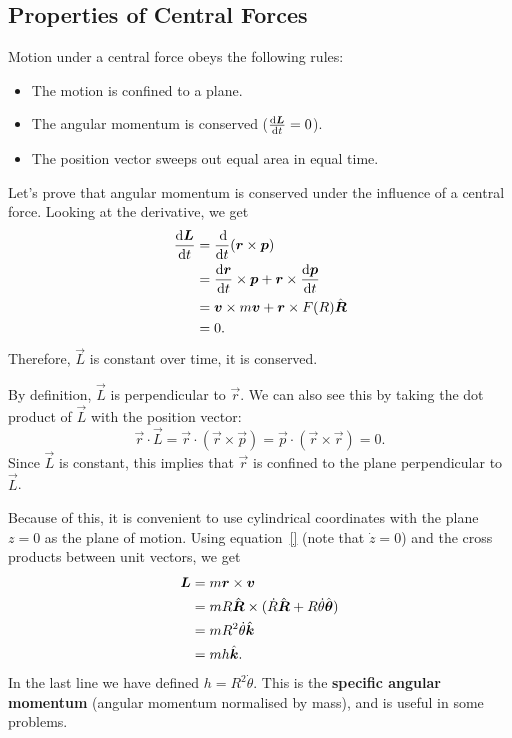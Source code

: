 \documentclass[../classical_mechanics.tex]{subfiles}
\begin{document}
        \subsection{Properties of Central Forces}\label{subsec:properties-of-central-forces}
            Motion under a central force obeys the following rules:
            \begin{itemize}
                \item The motion is confined to a plane.
                \item The angular momentum is conserved ($\dv{\vec{L}}{t}=0$).
                \item The position vector sweeps out equal area in equal time.
            \end{itemize}
            
            Let's prove that angular momentum is conserved under the influence of a central force.
            Looking at the derivative, we get
            \begin{align}
                \dv{\vec{L}}{t}&=\dv{}{t}(\vec{r}\times\vec{p})\\
                &=\dv{\vec{r}}{t}\times\vec{p}+\vec{r}\times\dv{\vec{p}}{t}\\
                &=\vec{v}\times m\vec{v}+\vec{r}\times F(R)\uvec{R}\\
                &=0.
            \end{align}
            Therefore, $\vec{L}$ is constant over time, it is conserved.

            By definition, $\vec{L}$ is perpendicular to $\vec{r}$.
            We can also see this by taking the dot product of $\vec{L}$ with the position vector:
            \begin{equation}
                \vec{r}\cdot\vec{L}=\vec{r}\cdot(\vec{r}\times\vec{p})=\vec{p}\cdot(\vec{r}\times\vec{r})=0.
            \end{equation}
            Since $\vec{L}$ is constant, this implies that $\vec{r}$ is confined to the plane perpendicular to $\vec{L}$.
            
            Because of this, it is convenient to use cylindrical coordinates with the plane $z=0$ as the plane of motion.
            Using equation~\ref{} (note that $\dot{z}=0$) and the cross products between unit vectors, we get
            \begin{align}
                \boldsymbol{L}&=m\boldsymbol{r}\times\boldsymbol{v}\\
                &=mR\hat{\boldsymbol{R}}\times(\dot{R}\hat{\boldsymbol{R}}+R\dot{\theta}\hat{\boldsymbol{\theta}})\\
                &=mR^2\dot{\theta}\hat{\boldsymbol{k}}\label{eq:angular-momentum-theta-dot}\\
                &=mh\hat{\boldsymbol{k}}.
            \end{align}
            In the last line we have defined $h=R^2\dot{\theta}$.
            This is the \textbf{specific angular momentum} (angular momentum normalised by mass), and is useful in some problems.
\end{document}

